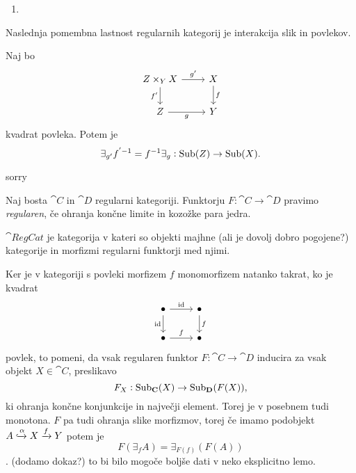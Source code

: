 \documentclass[../kategoricna_logika.tex]{subfiles}
\begin{document}
\begin{dokaz}
\begin{enumerate}[label=(\roman*)]
  \item
  


\end{enumerate}
\end{dokaz}

Naslednja pomembna lastnost regularnih kategorij je interakcija slik in povlekov.
\begin{lema}
  Naj bo
  \begin{equation*}
    \begin{tikzcd}
      Z \times_Y X \ar[d, "f'"'] \ar[r, "g'"] & X \ar[d, "f"] \\
      Z \ar[r, "g"'] & Y
    \end{tikzcd}
  \end{equation*}
  kvadrat povleka. Potem je
  $$\exists_{g'}f^{'-1} = f^{-1}\exists_g : \operatorname{Sub}(Z) \to \operatorname{Sub}(X).$$
\end{lema}
\begin{dokaz}
  sorry
\end{dokaz}
\begin{definicija}
  Naj bosta $\cat{C}$ in $\cat{D}$ regularni kategoriji.
  Funktorju ${F : \cat{C} \to \cat{D}}$ pravimo \emph{regularen}, če ohranja končne limite in kozožke para jedra.
\end{definicija}
\begin{definicija}
  $\cat{RegCat}$ je kategorija v kateri so objekti majhne (ali je dovolj dobro pogojene?) kategorije in morfizmi regularni funktorji med njimi.
\end{definicija}

Ker je v kategoriji s povleki morfizem $f$ monomorfizem natanko takrat, ko je kvadrat
\begin{equation*}
  \begin{tikzcd}
    \bullet \ar[d, "\mathrm{id}"'] \ar[r, "\mathrm{id}"] & \bullet \ar[d, "f"] \\
    \bullet \ar[r, "f"] & \bullet
  \end{tikzcd}
\end{equation*}
povlek, to pomeni, da vsak regularen funktor $F : \cat{C} \to \cat{D}$ inducira za vsak objekt $X \in \cat{C}$, preslikavo
$$F_X : \operatorname{Sub}_{\operatorname{\mathbf{C}}}(X) \to \operatorname{Sub}_{\operatorname{\mathbf{D}}}(F(X)),$$
ki ohranja končne konjunkcije in največji element. Torej je v posebnem tudi monotona. $F$ pa tudi ohranja slike morfizmov, torej če imamo podobjekt $A \xhookrightarrow{\alpha} X \xrightarrow{f} Y$ potem je 
$$F(\exists_f A) = \exists_{F(f)}(F(A))$$.
(dodamo dokaz?)
to bi bilo mogoče boljše dati v neko eksplicitno lemo.
%
\end{document}
